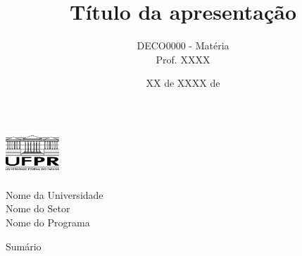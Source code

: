 \documentclass[aspectratio=169, 9pt]{beamer}
\title[short-title]{Título da apresentação}
\author[Nome do autor]{DECO0000 - Matéria \\ Prof. XXXX}
\institute[] %
{
    \vspace{0.5mm} {\normalsize Nome do autor} \vspace{5mm}
}
\date{XX de XXXX de \the\year{}}
\begin{document}
\begin{frame}[plain]
    \begin{center}
            \begin{minipage}[c]{0.2\linewidth}
                    \begin{center}
                    \includegraphics[width=2cm, height=1.7cm]{./Imagens/logo_UFPR.png} 
                    \end{center}
            \end{minipage}
            \begin{minipage}[c]{0.7\linewidth}
                    \begin{flushleft}
                    \begin{large}
                    Nome da Universidade \\ \vspace{1mm} Nome do Setor \\
                    \vspace{1mm} Nome do Programa
                    \end{large} 
                    \end{flushleft}
            \end{minipage}
    \end{center}
\titlepage 
\end{frame}


\begingroup
{}
\begin{frame}{Sumário}
	\tableofcontents[hideallsubsections]
\end{frame}
\endgroup




\nocite{*}






\end{document}

